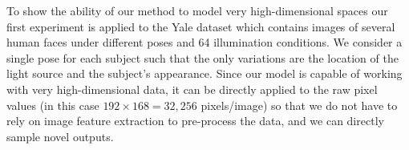 To show the ability of our method to model very
high-dimensional spaces our first experiment is applied to the Yale
dataset \cite{YaleFaces1, YaleFaces2} which contains images of several
human faces under different poses and 64 illumination conditions.  We
consider a single pose for each subject such that the only variations
are the location of the light source and the subject's appearance.
Since our model is capable of working with very high-dimensional data, %
it can be directly applied to the raw pixel values (in this
case $192 \times 168 = 32,256$ pixels/image) so that we do not
have to rely on image feature extraction to pre-process the data, and we can directly sample novel outputs.
%
%
